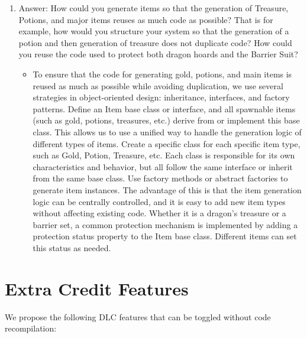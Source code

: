 \documentclass{article}
\begin{document}
\begin{enumerate}
\begin{itemize}
    \end{itemize}
    \item Answer: How could you generate items so that the generation of Treasure, Potions, and major items reuses as much code as possible? That is for example, how would you structure your system so that the generation of a potion and then generation of treasure does not duplicate code? How could you reuse the code used to protect both dragon hoards and the Barrier Suit?
    \begin{itemize}
        \item To ensure that the code for generating gold, potions, and main items is reused as much as possible while avoiding duplication, we use several strategies in object-oriented design: inheritance, interfaces, and factory patterns. Define an Item base class or interface, and all spawnable items (such as gold, potions, treasures, etc.) derive from or implement this base class. This allows us to use a unified way to handle the generation logic of different types of items. Create a specific class for each specific item type, such as Gold, Potion, Treasure, etc. Each class is responsible for its own characteristics and behavior, but all follow the same interface or inherit from the same base class. Use factory methods or abstract factories to generate item instances. The advantage of this is that the item generation logic can be centrally controlled, and it is easy to add new item types without affecting existing code. Whether it is a dragon's treasure or a barrier set, a common protection mechanism is implemented by adding a protection status property to the Item base class. Different items can set this status as needed.
    \end{itemize}
\end{enumerate}



\section{Extra Credit Features}
We propose the following DLC features that can be toggled without code recompilation:
\end{document}
